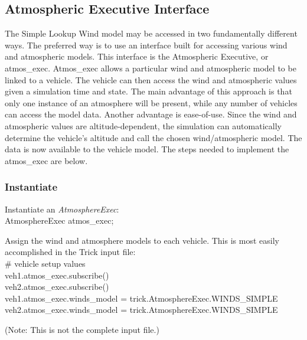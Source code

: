 \documentclass[11pt,fleqn]{report}
\begin{document}
\subsection{Atmospheric Executive Interface}
The Simple Lookup Wind model may be accessed in two fundamentally different ways.  The preferred way is to use an interface built for accessing various wind and atmospheric models.  This interface is the Atmospheric Executive, or atmos\_exec.  Atmos\_exec allows a particular wind and atmospheric model to be linked to a vehicle.  The vehicle can then access the wind and atmospheric values given a simulation time and state.  The main advantage of this approach is that only one instance of an atmosphere will be present, while any number of vehicles can access the model data.  Another advantage is ease-of-use.  Since the wind and atmospheric values are altitude-dependent, the simulation can automatically determine the vehicle's altitude and call the chosen wind/atmospheric model.  The data is now available to the vehicle model.  The steps needed to implement the atmos\_exec are below.

\subsubsection{Instantiate}
Instantiate an \textit{AtmosphereExec}:\\
\indent\hspace{1cm} \colorbox{customorange}{AtmosphereExec atmos\_exec;}

Assign the wind and atmosphere models to each vehicle.  This is most easily accomplished in the Trick input file:\\
\indent\hspace{1cm} \colorbox{customorange}{\# vehicle setup values}\\
\indent\hspace{1cm} \colorbox{customorange}{veh1.atmos\_exec.subscribe()}\\
\indent\hspace{1cm} \colorbox{customorange}{veh2.atmos\_exec.subscribe()}\\
\indent\hspace{1cm} \colorbox{customorange}{veh1.atmos\_exec.winds\_model = trick.AtmosphereExec.WINDS\_SIMPLE}\\
\indent\hspace{1cm} \colorbox{customorange}{veh2.atmos\_exec.winds\_model = trick.AtmosphereExec.WINDS\_SIMPLE}

\indent\hspace{1cm} (Note:  This is not the complete input file.)
\end{document}
